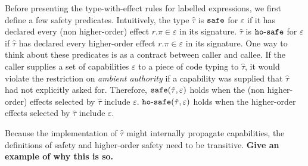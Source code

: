 \noindent 
Before presenting the type-with-effect rules for labelled expressions, we first define a few safety predicates. Intuitively, the type $\hat \tau$ is $\mathtt{safe}$ for $\varepsilon$ if it has declared every (non higher-order) effect $r.\pi \in \varepsilon$ in its signature. $\hat \tau$ is $\mathtt{ho \hbox{-} safe}$ for $\varepsilon$ if $\hat \tau$ has declared every higher-order effect $r.\pi \in \varepsilon$ in its signature. One way to think about these predicates is as a contract between caller and callee. If the caller supplies a set of capabilities $\varepsilon$ to a piece of code typing to $\hat \tau$, it would violate the restriction on \textit{ambient authority} if a capability was supplied that $\hat \tau$ had not explicitly asked for. Therefore, $\mathtt{safe}(\hat \tau, \varepsilon)$ holds when the (non higher-order) effects selected by $\hat \tau$ include $\varepsilon$. $\mathtt{ho \hbox{-} safe}(\hat \tau, \varepsilon)$ holds when the higher-order effects selected by $\hat  \tau$ include $\varepsilon$.

Because the implementation of $\hat \tau$ might internally propagate capabilities, the definitions of safety and higher-order safety need to be transitive. \textbf{Give an example of why this is so.}



